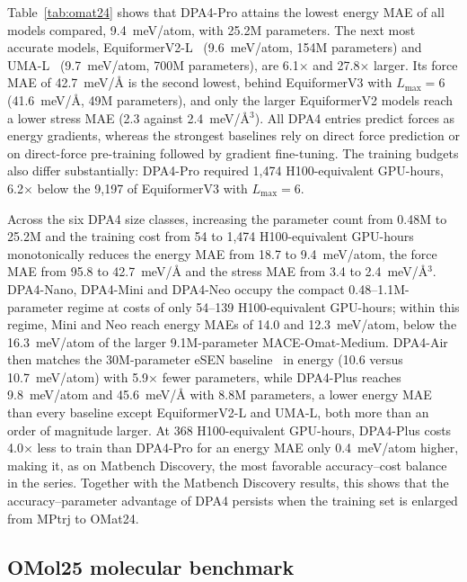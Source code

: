 Table~\ref{tab:omat24} shows that DPA4-Pro attains the lowest energy MAE of all models compared, 9.4~meV/atom, with 25.2M parameters.
The next most accurate models, EquiformerV2-L~\cite{liao2023equiformerv2,barroso2024open} (9.6~meV/atom, 154M parameters) and UMA-L~\cite{wood2025umafamilyuniversalmodels} (9.7~meV/atom, 700M parameters), are 6.1$\times$ and 27.8$\times$ larger.
Its force MAE of 42.7~meV/\AA{} is the second lowest, behind EquiformerV3 with $L_{\max}=6$~\cite{liao2026equiformerv3} (41.6~meV/\AA{}, 49M parameters), and only the larger EquiformerV2 models reach a lower stress MAE (2.3 against 2.4~meV/\AA$^3$).
All DPA4 entries predict forces as energy gradients, whereas the strongest baselines rely on direct force prediction or on direct-force pre-training followed by gradient fine-tuning.
The training budgets also differ substantially: DPA4-Pro required 1,474 H100-equivalent GPU-hours, 6.2$\times$ below the 9,197 of EquiformerV3 with $L_{\max}=6$.

Across the six DPA4 size classes, increasing the parameter count from 0.48M to 25.2M and the training cost from 54 to 1,474 H100-equivalent GPU-hours monotonically reduces the energy MAE from 18.7 to 9.4~meV/atom, the force MAE from 95.8 to 42.7~meV/\AA{} and the stress MAE from 3.4 to 2.4~meV/\AA$^3$.
DPA4-Nano, DPA4-Mini and DPA4-Neo occupy the compact 0.48--1.1M-parameter regime at costs of only 54--139 H100-equivalent GPU-hours; within this regime, Mini and Neo reach energy MAEs of 14.0 and 12.3~meV/atom, below the 16.3~meV/atom of the larger 9.1M-parameter MACE-Omat-Medium.
DPA4-Air then matches the 30M-parameter eSEN baseline~\cite{fu2025esen} in energy (10.6 versus 10.7~meV/atom) with 5.9$\times$ fewer parameters, while DPA4-Plus reaches 9.8~meV/atom and 45.6~meV/\AA{} with 8.8M parameters, a lower energy MAE than every baseline except EquiformerV2-L and UMA-L, both more than an order of magnitude larger.
At 368 H100-equivalent GPU-hours, DPA4-Plus costs 4.0$\times$ less to train than DPA4-Pro for an energy MAE only 0.4~meV/atom higher, making it, as on Matbench Discovery, the most favorable accuracy--cost balance in the series.
Together with the Matbench Discovery results, this shows that the accuracy--parameter advantage of DPA4 persists when the training set is enlarged from MPtrj to OMat24.

\subsection{OMol25 molecular benchmark}
\label{sec:omol25}

